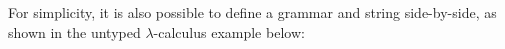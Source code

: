 \documentclass[runningheads]{llncs}
\DeclareRobustCommand{\hlred}[1]{{\sethlcolor{lred}\hl{#1}}}
\DeclareRobustCommand{\hlorange}[1]{{\sethlcolor{lorange}\hl{#1}}}
\DeclareRobustCommand{\hlgreen}[1]{{\sethlcolor{lgreen}\hl{#1}}}
\begin{document}
For simplicity, it is also possible to define a grammar and string side-by-side, as shown in the untyped $\lambda$-calculus example below:
\end{document}
